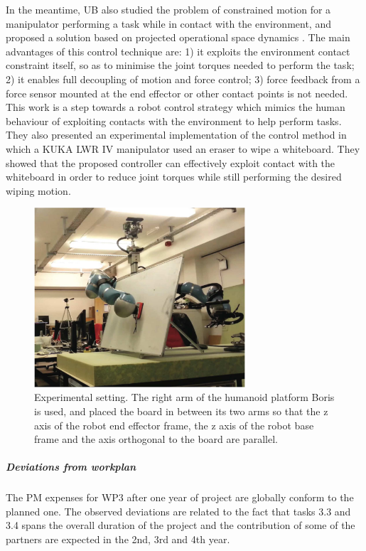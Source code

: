 In the meantime, UB also studied the problem of constrained motion for a manipulator performing
a task while in contact with the environment, and proposed a solution based on
projected operational space dynamics \cite{Ortenzietal14}.  The main
advantages of this control technique are: 1) it exploits the environment
contact constraint itself, so as to minimise the joint torques needed to
perform the task; 2) it enables full decoupling of motion and force control;
3) force feedback from a force sensor mounted at the end effector or other
contact points is not needed.  This work is a step towards a robot control
strategy which mimics the human behaviour of exploiting contacts with the
environment to help perform tasks.  They also presented an experimental
implementation of the control method in which a KUKA LWR IV manipulator used
an eraser to wipe a whiteboard.  They showed that the proposed controller can
effectively exploit contact with the whiteboard in order to reduce joint
torques while still performing the desired wiping motion.

\begin{figure}
  \centering
  \includegraphics[width=0.7\textwidth]{images/whiteboard.pdf}
  \caption{Experimental setting. The right arm of the humanoid
    platform Boris is used, and placed the board in between its two arms so that the z
    axis of the robot end effector frame, the z axis of the robot base frame
    and the axis orthogonal to the board are parallel.}
  \label{whiteboard}
\end{figure}





    
\subparagraph{Deviations from workplan}  

The PM expenses for WP3 after one year of project are globally conform to the planned one. The observed deviations are related to the fact that tasks 3.3 and 3.4 spans the overall duration of the project and the contribution of some of the partners are expected in the 2nd, 3rd and 4th year.

